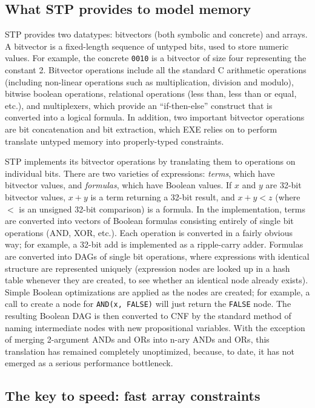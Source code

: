 \documentclass[11pt]{article}
\begin{document}
\subsection{What STP provides to model memory}
\label{sec:untyped:bytes}

STP provides two datatypes: bitvectors (both symbolic and concrete)
and arrays.  A bitvector is a fixed-length sequence of untyped bits,
used to store numeric values.  For example, the concrete {\tt 0010} is
a bitvector of size four representing the constant 2.  Bitvector
operations include all the standard C arithmetic operations (including
non-linear operations such as multiplication, division and modulo),
bitwise boolean operations, relational operations (less than, less
than or equal, etc.), and multiplexers, which provide an
``if-then-else'' construct that is converted into a logical formula.
In addition, two important bitvector operations are bit concatenation
and bit extraction, which EXE relies on to perform translate untyped
memory into properly-typed constraints.

STP implements its bitvector operations by translating them to operations
on individual bits.  There are two varieties of expressions: {\em
terms}, which have bitvector values, and {\em formulas\/}, which have
Boolean values.  If $x$ and $y$ are 32-bit bitvector values, $x + y$
is a term returning a 32-bit result, and $x + y < z$ (where $<$ is an
unsigned 32-bit comparison) is a formula.  In the implementation, terms
are converted into vectors of Boolean formulas consisting entirely of
single bit operations (AND, XOR, etc.).  Each operation is converted
in a fairly obvious way; for example, a 32-bit add is implemented as
a ripple-carry adder.  Formulas are converted into DAGs of single bit
operations, where
expressions with identical structure are represented uniquely
(expression nodes are looked up in a hash table whenever they are
created, to see whether an identical node already exists).
Simple Boolean optimizations are applied as the nodes are
created; for example, a call to create a node for {\tt AND(x, FALSE)}
will just return the {\tt FALSE} node.  The resulting Boolean DAG is
then converted to CNF by the standard method of naming intermediate
nodes with new propositional variables.  With the exception of merging
2-argument ANDs and ORs into n-ary ANDs and ORs, this translation has
remained completely unoptimized, because, to date, it has not emerged
as a serious performance bottleneck.


\subsection{The key to speed: fast array constraints}
\label{sec:stp:arrays}
\end{document}
